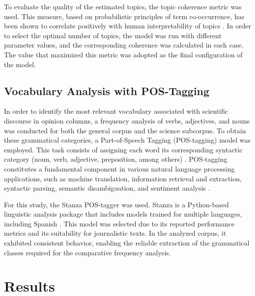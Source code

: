 \documentclass[11pt,a4paper]{article}
\begin{document}
	To evaluate the quality of the estimated topics, the topic coherence metric was used. This measure, based on probabilistic principles of term co-occurrence, has been shown to correlate positively with human interpretability of topics \cite{Rder2015}. In order to select the optimal number of topics, the model was run with different parameter values, and the corresponding coherence was calculated in each case. The value that maximized this metric was adopted as the final configuration of the model.


	\subsection{Vocabulary Analysis with POS-Tagging}
	
	In order to identify the most relevant vocabulary associated with scientific discourse in opinion columns, a frequency analysis of verbs, adjectives, and nouns was conducted for both the general corpus and the science subcorpus. To obtain these grammatical categories, a Part-of-Speech Tagging (POS-tagging) model was employed. This task consists of assigning each word its corresponding syntactic category (noun, verb, adjective, preposition, among others) \cite{he2020surveyrecentadvancessequence}. POS-tagging constitutes a fundamental component in various natural language processing applications, such as machine translation, information retrieval and extraction, syntactic parsing, semantic disambiguation, and sentiment analysis \cite{Chiche2022}.
	
	For this study, the Stanza POS-tagger was used. Stanza is a Python-based linguistic analysis package that includes models trained for multiple languages, including Spanish \cite{qi2020stanzapythonnaturallanguage}. This model was selected due to its reported performance metrics and its suitability for journalistic texts. In the analyzed corpus, it exhibited consistent behavior, enabling the reliable extraction of the grammatical classes required for the comparative frequency analysis.
	
	
	
	\section{Results}
\end{document}
